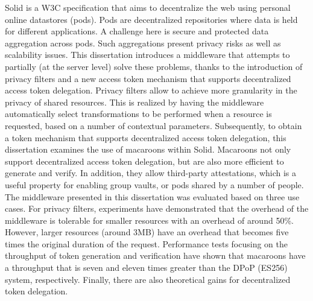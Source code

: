 {\small Solid is a W3C specification that aims to decentralize the web using personal online datastores (pods). Pods are decentralized repositories where data is held for different applications. A challenge here is secure and protected data aggregation across pods. Such aggregations present privacy risks as well as scalability issues. This dissertation introduces a middleware that attempts to partially (at the server level) solve these problems, thanks to the introduction of privacy filters and a new access token mechanism that supports decentralized access token delegation.
Privacy filters allow to achieve more granularity in the privacy of shared resources. This is realized by having the middleware automatically select transformations to be performed when a resource is requested, based on a number of contextual parameters. Subsequently, to obtain a token mechanism that supports decentralized access token delegation, this dissertation examines the use of macaroons within Solid. Macaroons not only support decentralized access token delegation, but are also more efficient to generate and verify. In addition, they allow third-party attestations, which is a useful property for enabling group vaults, or pods shared by a number of people.
The middleware presented in this dissertation was evaluated based on three use cases. For privacy filters, experiments have demonstrated that the overhead of the middleware is tolerable for smaller resources with an overhead of around 50\%. However, larger resources (around 3MB) have an overhead that becomes five times the original duration of the request. Performance tests focusing on the throughput of token generation and verification have shown that macaroons have a throughput that is seven and eleven times greater than the DPoP (ES256) system, respectively. Finally, there are also theoretical gains for decentralized token delegation.}
